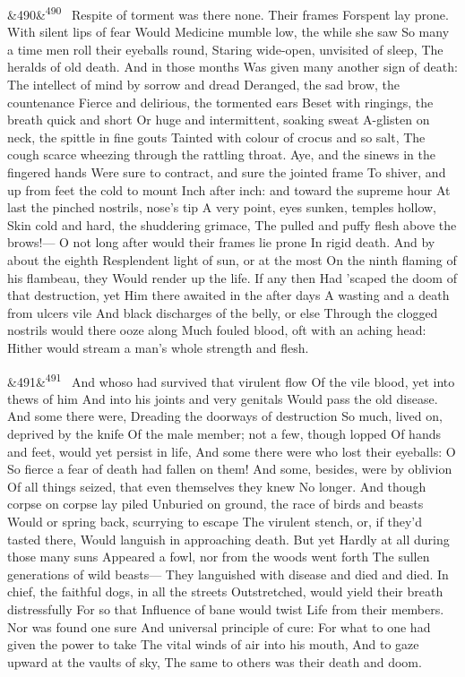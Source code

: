 \documentclass[12pt]{article}
\newcommand{\para}[1][]{\par\noindent\ifx&#1&\else\textsuperscript{\footnotesize #1}~\fi}
\begin{document}
\para[490] Respite of torment was there none. Their frames Forspent lay prone. With silent lips of fear Would Medicine mumble low, the while she saw So many a time men roll their eyeballs round, Staring wide-open, unvisited of sleep, The heralds of old death. And in those months Was given many another sign of death: The intellect of mind by sorrow and dread Deranged, the sad brow, the countenance Fierce and delirious, the tormented ears Beset with ringings, the breath quick and short Or huge and intermittent, soaking sweat A-glisten on neck, the spittle in fine gouts Tainted with colour of crocus and so salt, The cough scarce wheezing through the rattling throat. Aye, and the sinews in the fingered hands Were sure to contract, and sure the jointed frame To shiver, and up from feet the cold to mount Inch after inch: and toward the supreme hour At last the pinched nostrils, nose's tip A very point, eyes sunken, temples hollow, Skin cold and hard, the shuddering grimace, The pulled and puffy flesh above the brows!--- O not long after would their frames lie prone In rigid death. And by about the eighth Resplendent light of sun, or at the most On the ninth flaming of his flambeau, they Would render up the life. If any then Had 'scaped the doom of that destruction, yet Him there awaited in the after days A wasting and a death from ulcers vile And black discharges of the belly, or else Through the clogged nostrils would there ooze along Much fouled blood, oft with an aching head: Hither would stream a man's whole strength and flesh.

\para[491] And whoso had survived that virulent flow Of the vile blood, yet into thews of him And into his joints and very genitals Would pass the old disease. And some there were, Dreading the doorways of destruction So much, lived on, deprived by the knife Of the male member; not a few, though lopped Of hands and feet, would yet persist in life, And some there were who lost their eyeballs: O So fierce a fear of death had fallen on them! And some, besides, were by oblivion Of all things seized, that even themselves they knew No longer. And though corpse on corpse lay piled Unburied on ground, the race of birds and beasts Would or spring back, scurrying to escape The virulent stench, or, if they'd tasted there, Would languish in approaching death. But yet Hardly at all during those many suns Appeared a fowl, nor from the woods went forth The sullen generations of wild beasts--- They languished with disease and died and died. In chief, the faithful dogs, in all the streets Outstretched, would yield their breath distressfully For so that Influence of bane would twist Life from their members. Nor was found one sure And universal principle of cure: For what to one had given the power to take The vital winds of air into his mouth, And to gaze upward at the vaults of sky, The same to others was their death and doom.
\end{document}

